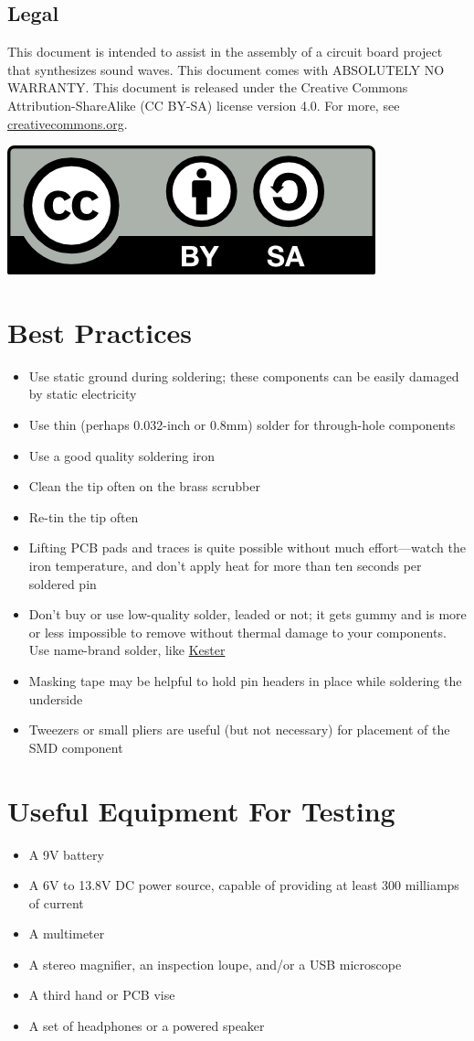 \documentclass[12pt]{article}
\newcommand{\+}{\item}		%
\newcommand{\bi}{\begin{itemize}}
\newcommand{\ei}{\end{itemize}}
\begin{document}
\subsection*{Legal}

This document is intended to assist in the assembly of a circuit board project that synthesizes sound waves. This document comes with ABSOLUTELY NO WARRANTY. This document is released under the Creative Commons Attribution-ShareAlike  (CC BY-SA) license version 4.0. For more, see {\color{webblue}\href{https://creativecommons.org/licenses/}{creativecommons.org}}.
\begin{center}
\includegraphics[scale=1.0]{by-sa.png}
\end{center}



\section{Best Practices}
\bi
\+ Use static ground during soldering; these components can be easily damaged by static electricity
\+ Use thin (perhaps 0.032-inch or 0.8mm) solder for through-hole components
\+ Use a good quality soldering iron %
\+ Clean the tip often on the brass scrubber
\+ Re-tin the tip often
\+ Lifting PCB pads and traces is quite possible without much effort---watch the iron temperature, and don't apply heat for more than ten seconds per soldered pin 
\+ Don't buy or use low-quality solder, leaded or not; it gets gummy and is more or less impossible to remove without thermal damage to your components. Use name-brand solder, like {\color{webblue}\href{http://www.kester.com}{Kester}}
\+ Masking tape may be helpful to hold pin headers in place while soldering the underside
\+ Tweezers or small pliers are useful (but not necessary) for placement of the SMD component
\ei


\section{Useful Equipment For Testing}
\bi
\+ A 9V battery
\+ A 6V to 13.8V DC power source, capable of providing at least 300 milliamps of current
\+ A multimeter
\+ A stereo magnifier, an inspection loupe, and/or a USB microscope
\+ A third hand or PCB vise
\+ A set of headphones or a powered speaker
\ei
\end{document}
